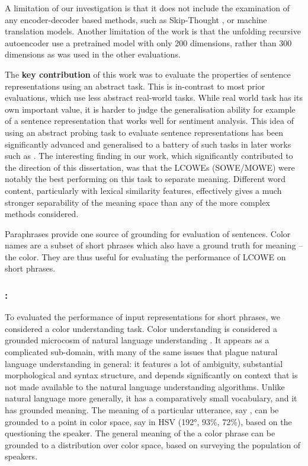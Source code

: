 \documentclass{book}
\begin{document}
A limitation of our investigation is that it does not include the examination of any encoder-decoder based methods, such as Skip-Thought \citep{DBLP:journals/corr/KirosZSZTUF15}, or machine translation models.
Another limitation of the work is that the unfolding recursive autoencoder \citep{SocherEtAl2011:PoolRAE}  use a pretrained model with only 200 dimensions, rather than 300 dimensions as was used in the other evaluations.


The \textbf{key contribution} of this work was to evaluate the properties of sentence representations using an abstract task.
This is in-contrast to most prior evaluations, which use less abstract real-world tasks.
While real world task has its own important value, it is harder to judge the generalisation ability for example of a sentence representation that works well for sentiment analysis.
This idea of using an abstract probing task to evaluate sentence representations has been significantly advanced and generalised to a battery of such tasks in later works such as \citet{adi2017Probing,ac2018probingsentencevectors}.
The interesting finding in our work, which significantly contributed to the direction of this dissertation,
was that the LCOWEs (SOWE/MOWE) were notably the best performing on this task to separate meaning.
Different word content, particularly with lexical similarity features, effectively gives a much stronger separability of the meaning space than any of the more complex methods considered.


Paraphrases provide one source of grounding for evaluation of sentences.
Color names are a subset of short phrases which also have a ground truth for meaning -- the color.
They are thus useful for evaluating the performance of LCOWE on short phrases.

\subsubsection{: }
To evaluated the performance of input representations for short phrases, we considered a color understanding task.
Color understanding is considered a grounded microcosm of natural language understanding \citep{2016arXiv160603821M}.
It appears as a complicated sub-domain, with many of the same issues that plague natural language understanding in general:
it features a lot of ambiguity, substantial morphological and syntax structure, and depends significantly on context that is not made available to the natural language understanding algorithms.
Unlike natural language more generally, it has a comparatively small vocabulary, and it has grounded meaning.
The meaning of a particular utterance, say , can be grounded to a point in color space, say in HSV (192°, 93\%, 72\%), based on the questioning the speaker.
The general meaning of the a color phrase can be grounded to a distribution over color space, based on surveying the population of speakers.
\end{document}
